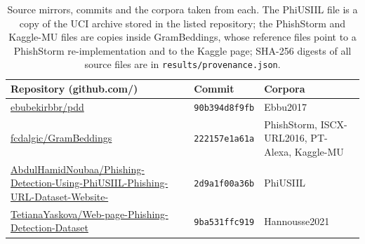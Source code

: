 \begin{table}[tp]
\centering
\caption{Source mirrors, commits and the corpora taken from each. The PhiUSIIL file is a copy of the UCI archive stored in the listed repository; the PhishStorm and Kaggle-MU files are copies inside GramBeddings, whose reference files point to a PhishStorm re-implementation and to the Kaggle page; SHA-256 digests of all source files are in \texttt{results/provenance.json}.}
\label{tab:prov}
\footnotesize
\begin{tabular}{@{}>{\raggedright\arraybackslash}p{6.4cm}lp{3.6cm}@{}}
\toprule
Repository (github.com/) & Commit & Corpora \\
\midrule
\url{ebubekirbbr/pdd} & \texttt{90b394d8f9fb} & Ebbu2017 \\
\url{fcdalgic/GramBeddings} & \texttt{222157e1a61a} & PhishStorm, ISCX-URL2016, PT-Alexa, Kaggle-MU \\
\url{AbdulHamidNoubaa/Phishing-Detection-Using-PhiUSIIL-Phishing-URL-Dataset-Website-} & \texttt{2d9a1f00a36b} & PhiUSIIL \\
\url{TetianaYaskova/Web-page-Phishing-Detection-Dataset} & \texttt{9ba531ffc919} & Hannousse2021 \\
\bottomrule
\end{tabular}
\end{table}

